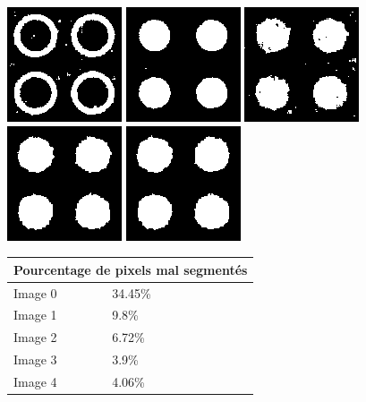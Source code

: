 \documentclass[a4paper,12pt]{report}
\begin{document}
\begin{figure}[htp]
  \centering
	\includegraphics[scale=0.3]{image/p3b0.png}
	\includegraphics[scale=0.3]{image/p3b1.png}
	\includegraphics[scale=0.3]{image/p3b2.png}
	\includegraphics[scale=0.3]{image/p3b3.png}
	\includegraphics[scale=0.3]{image/p3b4.png}

\begin{center}
\begin{longtable}[c]{|p{0.4\linewidth}| p{0.6\linewidth}|} 

	\hline
		\multicolumn{2}{|c|}{Pourcentage de pixels mal segmentés} \\ \hline
	Image 0	&	 34.45\% \\ \hline
	Image 1	&	 9.8\% \\ \hline
	Image 2	&	 6.72\% \\	 \hline
	Image 3	&	 3.9\% \\ \hline
	Image 4	&	 4.06\% \\ \hline
	
\end{longtable}
\end{center}
\end{figure}
\end{document}
